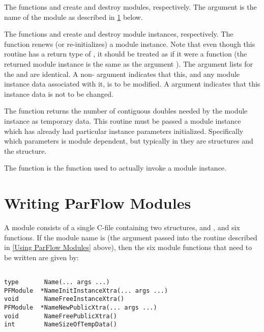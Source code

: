 The functions  and 
create and destroy modules, respectively.
The argument  is the name of the module as described in
\ref{Writing ParFlow Modules} below.

The functions  and 
create and destroy module instances, respectively.
The function  renews (or re-initializes) a
module instance.
Note that even though this routine has a return type of ,
it should be treated as if it were a  function (the returned
module instance is the same as the argument ).
The argument lists for the  and
 are identical.
A non- argument indicates that this, and any module instance
data associated with it, is to be modified.
A  argument indicates that this instance data is not to be changed.

The function  returns the number of
contiguous doubles needed by the module instance as temporary data.
This routine must be passed a module instance which has already
had particular instance parameters initialized.
Specifically which parameters is module dependent, but typically
in \parflow{} they are  structures and the
 structure.

The function  is the function used to actually
invoke a module instance.


\section{Writing ParFlow Modules}
\label{Writing ParFlow Modules}

A \parflow{} module consists of a single C-file containing
two structures,  and , and
six functions.
If the module name is 
(the  argument passed into the 
routine described in \ref{Using ParFlow Modules} above),
then the six module functions that need to be written are given by:

\begin{display}\begin{verbatim}

type       Name(... args ...)
PFModule  *NameInitInstanceXtra(... args ...)
void       NameFreeInstanceXtra()
PFModule  *NameNewPublicXtra(... args ...)
void       NameFreePublicXtra()
int        NameSizeOfTempData()

\end{verbatim}\end{display}

